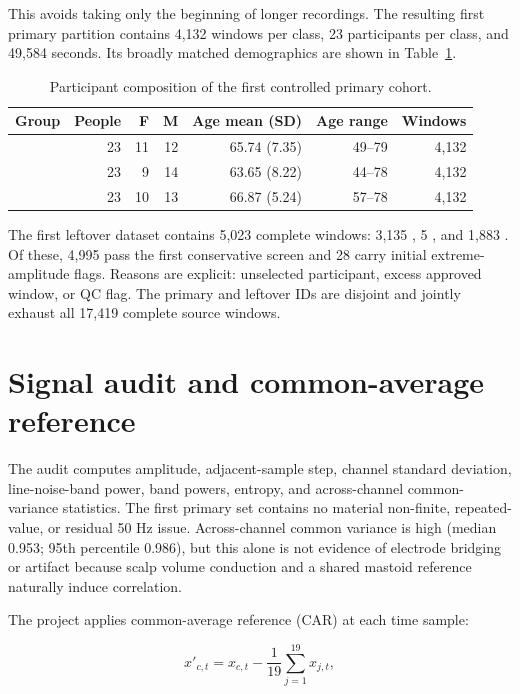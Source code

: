 This avoids taking only the beginning of longer recordings. The resulting first
primary partition contains 4,132 windows per class, 23 participants per class,
and 49,584 seconds. Its broadly matched demographics are shown in
Table~\ref{tab:matched-demographics}.

\begin{table}[htbp]
\centering
\begin{tabular}{lrrrrrr}
\toprule
\textbf{Group} & \textbf{People} & \textbf{F} & \textbf{M} & \textbf{Age mean (SD)} & \textbf{Age range} & \textbf{Windows}\\
\midrule
\AD{} & 23 & 11 & 12 & 65.74 (7.35) & 49--79 & 4,132\\
\FTD{} & 23 & 9 & 14 & 63.65 (8.22) & 44--78 & 4,132\\
\CN{} & 23 & 10 & 13 & 66.87 (5.24) & 57--78 & 4,132\\
\bottomrule
\end{tabular}
\caption{Participant composition of the first controlled primary cohort.}
\label{tab:matched-demographics}
\end{table}

The first leftover dataset contains 5,023 complete windows: 3,135 \AD{}, 5
\FTD{}, and 1,883 \CN{}. Of these, 4,995 pass the first conservative screen and
28 carry initial extreme-amplitude flags. Reasons are explicit: unselected
participant, excess approved window, or QC flag. The primary and leftover IDs
are disjoint and jointly exhaust all 17,419 complete source windows.

\section{Signal audit and common-average reference}

The audit computes amplitude, adjacent-sample step, channel standard deviation,
line-noise-band power, band powers, entropy, and across-channel common-variance
statistics. The first primary set contains no material non-finite, repeated-
value, or residual 50 Hz issue. Across-channel common variance is high (median
0.953; 95th percentile 0.986), but this alone is not evidence of electrode
bridging or artifact because scalp volume conduction and a shared mastoid
reference naturally induce correlation.

The project applies common-average reference (CAR) at each time sample:

\begin{equation}
x'_{c,t}=x_{c,t}-\frac{1}{19}\sum_{j=1}^{19}x_{j,t},
\end{equation}

